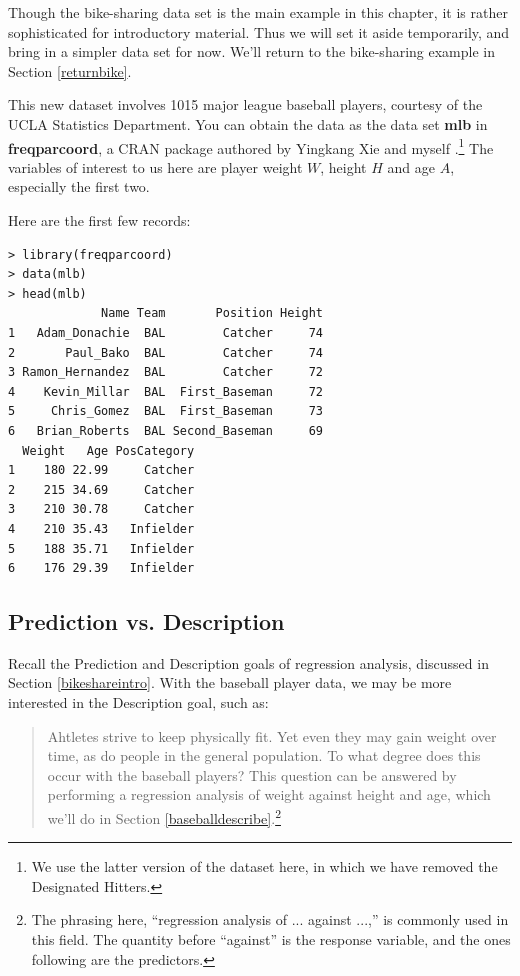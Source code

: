 Though the bike-sharing data set is the main example in this chapter, it
is rather sophisticated for introductory material.  Thus we will set it
aside temporarily, and bring in a simpler data set for now.  We'll
return to the bike-sharing example in Section \ref{returnbike}.

This new dataset involves 1015 major league baseball players, courtesy
of the UCLA Statistics Department.  You can obtain the data as the data
set {\bf mlb} in {\bf freqparcoord}, a CRAN package authored by Yingkang
Xie and myself \cite{freqparcoord}.\footnote{We use the latter version
of the dataset here, in which we have removed the Designated Hitters.}
The variables of interest to us here are player weight $W$, height $H$
and age $A$, especially the first two.

Here are the first few records:

\begin{lstlisting}
> library(freqparcoord)
> data(mlb)
> head(mlb)
             Name Team       Position Height
1   Adam_Donachie  BAL        Catcher     74
2       Paul_Bako  BAL        Catcher     74
3 Ramon_Hernandez  BAL        Catcher     72
4    Kevin_Millar  BAL  First_Baseman     72
5     Chris_Gomez  BAL  First_Baseman     73
6   Brian_Roberts  BAL Second_Baseman     69
  Weight   Age PosCategory
1    180 22.99     Catcher
2    215 34.69     Catcher
3    210 30.78     Catcher
4    210 35.43   Infielder
5    188 35.71   Infielder
6    176 29.39   Infielder
\end{lstlisting}

\subsection{Prediction vs. Description}

Recall the Prediction and Description goals of regression analysis,
discussed in Section \ref{bikeshareintro}.  With the baseball player
data, we may be more interested in the Description goal, such as:

\begin{quote}

Ahtletes strive to keep physically fit.  Yet even they may gain weight
over time, as do people in the general population.  To what degree does
this occur with the baseball players?  This question can be answered by
performing a regression analysis of weight against height and age, which
we'll do in Section \ref{baseballdescribe}.\footnote{The phrasing here,
``regression analysis of ... against ...,'' is commonly used in this
field. The quantity before ``against'' is the response variable, and the
ones following are the predictors.}

\end{quote}

